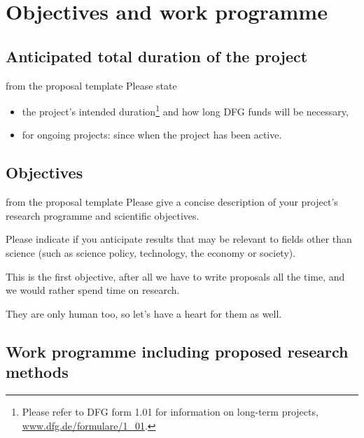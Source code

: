 \section{Objectives and work programme}\label{sec:workplan}

\subsection{Anticipated total duration of the project}\label{sec:duration}

\begin{todo}{from the proposal template}
Please state
\begin{itemize}
 \item the project's intended duration\footnote{Please refer to DFG form 1.01 for information on long-term projects, \url{www.dfg.de/formulare/1_01}.} and how long DFG funds will be necessary,
 \item for ongoing projects: since when the project has been active.
\end{itemize}
\end{todo}

\subsection{Objectives}\label{sec:objectives}

\begin{todo}{from the proposal template}
	Please give a concise description of your project's research programme and scientific objectives.
	
	Please indicate if you anticipate results that may be relevant to fields other than science (such as science policy, technology, the economy or society).
\end{todo}

\begin{objective}[id=firstobj,title=Supporting Authors]
  This is the first objective, after all we have to write proposals all the time, and we
  would rather spend time on research. 
\end{objective}

\begin{objective}[id=secondobj,title=Supporting Reviewers]
  They are only human too, so let's have a heart for them as well. 
\end{objective}


\subsection{Work programme including proposed research methods}\label{sec:wawp}

